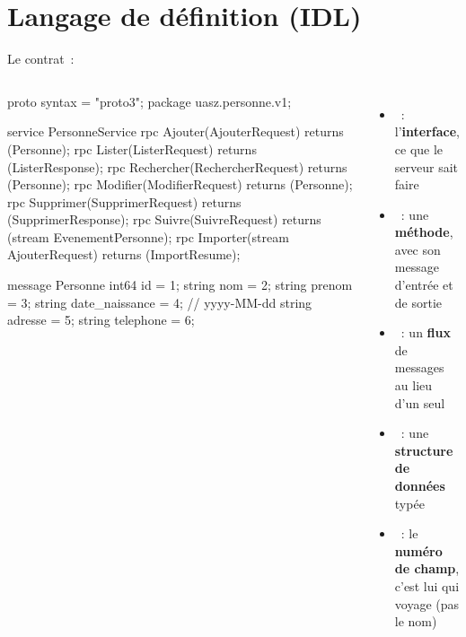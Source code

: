 \documentclass[aspectratio=169,11pt]{beamer}
\begin{document}
\section{Langage de définition (IDL)}

\begin{frame}[fragile]{Le contrat~: }
  \begin{columns}[T,onlytextwidth]
\begin{codetiny}{proto}
syntax = "proto3";
package uasz.personne.v1;

service PersonneService {
  rpc Ajouter(AjouterRequest)       returns (Personne);
  rpc Lister(ListerRequest)         returns (ListerResponse);
  rpc Rechercher(RechercherRequest) returns (Personne);
  rpc Modifier(ModifierRequest)     returns (Personne);
  rpc Supprimer(SupprimerRequest)   returns (SupprimerResponse);
  rpc Suivre(SuivreRequest)         returns (stream EvenementPersonne);
  rpc Importer(stream AjouterRequest) returns (ImportResume);
}

message Personne {
  int64  id             = 1;
  string nom            = 2;
  string prenom         = 3;
  string date_naissance = 4;   // yyyy-MM-dd
  string adresse        = 5;
  string telephone      = 6;
}
\end{codetiny}
    \footnotesize
    \begin{itemize}
      \item<2-> ~: l'\textbf{interface}, ce que le serveur sait faire
      \item<3-> ~: une \textbf{méthode}, avec son message d'entrée et de sortie
      \item<4-> ~: un \textbf{flux} de messages au lieu d'un seul
      \item<5-> ~: une \textbf{structure de données} typée
      \item<6-> ~: le \textbf{numéro de champ}, c'est lui qui voyage (pas le nom)
    \end{itemize}
  \end{columns}
\end{frame}
\end{document}
